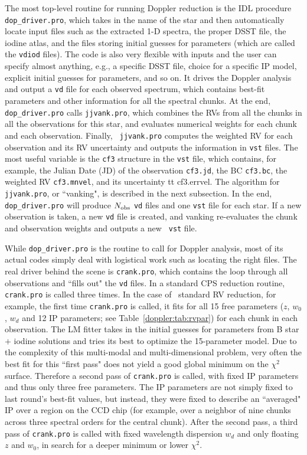 The most top-level routine for running Doppler reduction is the IDL
procedure {\tt dop\_driver.pro}, which takes in the name of the star
and then automatically locate input files such as the extracted 1-D
spectra, the proper DSST file, the iodine atlas, and the files storing
initial guesses for parameters (which are called the {\tt vdiod}
files). The code is also very flexible with inputs and the user can
specify almost anything, e.g., a specific DSST file, choice for a
specific IP model, explicit initial guesses for parameters, and so
on. It drives the Doppler analysis and output a {\tt vd} file for each
observed spectrum, which contains best-fit parameters and other
information for all the spectral chunks. At the end, {\tt
  dop\_driver.pro} calls {\tt jjvank.pro}, which combines the RVs from
all the chunks in all the observations for this star, and evaluates
numerical weights for each chunk and each observation. Finally, {\tt
  jjvank.pro} computes the weighted RV for each observation and its RV
uncertainty and outputs the information in {\tt vst} files. The most
useful variable is the {\tt cf3} structure in the {\tt vst} file,
which contains, for example, the Julian Date (JD) of the observation
{\tt cf3.jd}, the BC {\tt cf3.bc}, the weighted RV {\tt cf3.mnvel},
and its uncertainty {tt cf3.errvel}. The algorithm for {\tt
  jjvank.pro}, or ``vanking", is described in the next
subsection. In the end, {\tt dop\_driver.pro} will produce $N_{\rm obs}$
{\tt vd} files and one {\tt vst} file for each star. If a new
observation is taken, a new {\tt vd} file is created, and vanking
re-evaluates the chunk and observation weights and outputs a new {\tt
  vst} file.

While {\tt dop\_driver.pro} is the routine to call for Doppler
analysis, most of its actual codes simply deal with logistical work
such as locating the right files. The real driver behind the scene is
{\tt crank.pro}, which contains the loop through all observations and
``fills out" the {\tt vd} files. In a standard CPS reduction routine,
{\tt crank.pro} is called three times. In the case of \keck\ standard
RV reduction, for example, the first time {\tt crank.pro} is called,
it fits for all 15 free parameters ($z$, $w_0$, $w_d$ and 12 IP
parameters; see Table~\ref{doppler:tab:rvpar}) for each chunk in each
observation. The LM fitter takes in the initial guesses for parameters
from B star $+$ iodine solutions and tries its best to optimize the 15-parameter
model. Due to the complexity of this multi-modal and multi-dimensional
problem, very often the best fit for this ``first pass" does not yield
a good global minimum on the $\chi^2$ surface. Therefore a second
pass of {\tt crank.pro} is called, with fixed IP parameters and thus
only three free parameters. The IP parameters are not simply fixed to last
round's best-fit values, but instead, they were fixed to describe an
``averaged" IP over a region on the CCD chip (for example, over a
neighbor of nine chunks across three spectral orders for the central
chunk). After the second pass, a third pass of {\tt crank.pro} is
called with fixed wavelength dispersion $w_d$ and only floating $z$
and $w_0$, in search for a deeper minimum or lower $\chi^2$.


